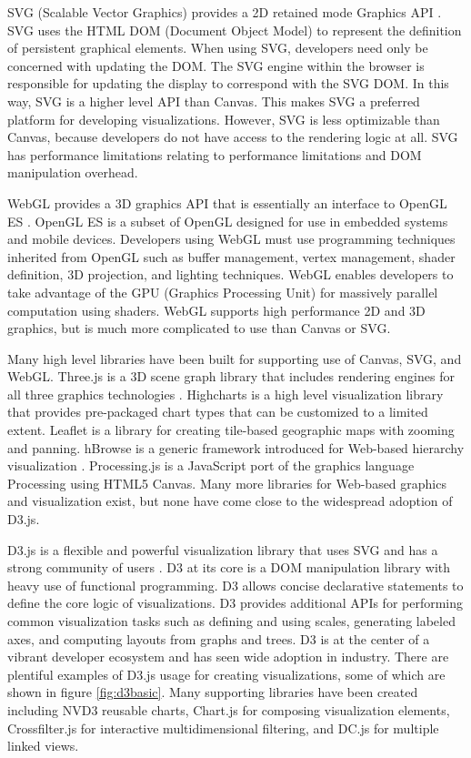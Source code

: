 \documentclass[12pt]{article}
\begin{document}
\begin{doublespace}
SVG (Scalable Vector Graphics) provides a 2D retained mode Graphics API \cite{svg}. SVG uses the HTML DOM (Document Object Model) to represent the definition of persistent graphical elements. When using SVG, developers need only be concerned with updating the DOM. The SVG engine within the browser is responsible for updating the display to correspond with the SVG DOM. In this way, SVG is a higher level API than Canvas. This makes SVG a preferred platform for developing visualizations. However, SVG is less optimizable than Canvas, because developers do not have access to the rendering logic at all. SVG has performance limitations relating to performance limitations and DOM manipulation overhead.

WebGL provides a 3D graphics API that is essentially an interface to OpenGL ES \cite{matsuda2013webgl}. OpenGL ES is a subset of OpenGL designed for use in embedded systems and mobile devices. Developers using WebGL must use programming techniques inherited from OpenGL such as buffer management, vertex management, shader definition, 3D projection, and lighting techniques. WebGL enables developers to take advantage of the GPU (Graphics Processing Unit) for massively parallel computation using shaders. WebGL supports high performance 2D and 3D graphics, but is much more complicated to use than Canvas or SVG.

Many high level libraries have been built for supporting use of Canvas, SVG, and WebGL. Three.js is a 3D scene graph library that includes rendering engines for all three graphics technologies \cite{cabello2010three}. Highcharts is a high level visualization library that provides pre-packaged chart types that can be customized to a limited extent. Leaflet is a library for creating tile-based geographic maps with zooming and panning. hBrowse is a generic framework introduced for Web-based hierarchy visualization \cite{kokoszkiewicz2012hbrowse}. Processing.js is a JavaScript port of the graphics language Processing using HTML5 Canvas. Many more libraries for Web-based graphics and visualization exist, but none have come close to the widespread adoption of D3.js.

D3.js is a flexible and powerful visualization library that uses SVG and has a strong community of users \cite{d3}. D3 at its core is a DOM manipulation library with heavy use of functional programming. D3 allows concise declarative statements to define the core logic of visualizations. D3 provides additional APIs for performing common visualization tasks such as defining and using scales, generating labeled axes, and computing layouts from graphs and trees. D3 is at the center of a vibrant developer ecosystem and has seen wide adoption in industry. There are plentiful examples of D3.js usage for creating visualizations, some of which are shown in figure \ref{fig:d3basic}. Many supporting libraries have been created including NVD3 reusable charts, Chart.js for composing visualization elements, Crossfilter.js for interactive multidimensional filtering, and DC.js for multiple linked views.


\end{doublespace}
\end{document}
